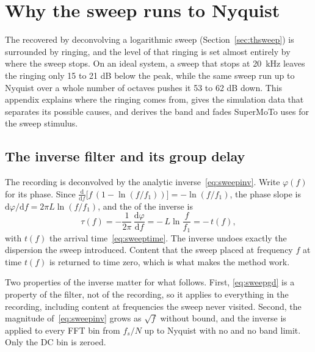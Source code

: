 \chapter{Why the sweep runs to Nyquist}\label{ch:sweepband}

The  recovered by deconvolving a logarithmic sweep (Section~\ref{sec:thsweep}) is surrounded by ringing, and the level of that ringing is set almost entirely by where the sweep stops. On an ideal system, a sweep that stops at \SI{20}{\kilo\hertz} leaves the ringing only 15 to 21 dB below the peak, while the same sweep run up to Nyquist over a whole number of octaves pushes it 53 to 62 dB down. This appendix explains where the ringing comes from, gives the simulation data that separates its possible causes, and derives the band and fades SuperMoTo uses for the sweep stimulus.

\section{The inverse filter and its group delay}
The recording is deconvolved by the analytic inverse~\eqref{eq:sweepinv}. Write $\varphi(f)$ for its phase. Since $\frac{\mathrm{d}}{\mathrm{d}f}\bigl[f\,(1-\ln(f/f_1))\bigr] = -\ln(f/f_1)$, the phase slope is $\mathrm{d}\varphi/\mathrm{d}f = 2\pi L \ln(f/f_1)$, and the  of the inverse is
\begin{equation}
  \tau(f) = -\frac{1}{2\pi}\,\frac{\mathrm{d}\varphi}{\mathrm{d}f}
          = -\,L \ln\frac{f}{f_1} = -\,t(f),
  \label{eq:sweepgd}
\end{equation}
with $t(f)$ the arrival time~\eqref{eq:sweeptime}. The inverse undoes exactly the dispersion the sweep introduced. Content that the sweep placed at frequency $f$ at time $t(f)$ is returned to time zero, which is what makes the method work.

Two properties of the inverse matter for what follows. First, \eqref{eq:sweepgd} is a property of the filter, not of the recording, so it applies to everything in the recording, including content at frequencies the sweep never visited. Second, the magnitude of~\eqref{eq:sweepinv} grows as $\sqrt{f}$ without bound, and the inverse is applied to every FFT bin from $f_s/N$ up to Nyquist with no  and no band limit. Only the DC bin is zeroed.


